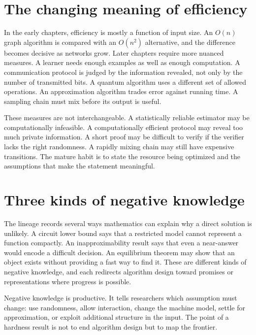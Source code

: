 \section{The changing meaning of efficiency}
In the early chapters, efficiency is mostly a function of input size. An $O(n)$ graph algorithm is compared with an $O(n^2)$ alternative, and the difference becomes decisive as networks grow. Later chapters require more nuanced measures. A learner needs enough examples as well as enough computation. A communication protocol is judged by the information revealed, not only by the number of transmitted bits. A quantum algorithm uses a different set of allowed operations. An approximation algorithm trades error against running time. A sampling chain must mix before its output is useful.

These measures are not interchangeable. A statistically reliable estimator may be computationally infeasible. A computationally efficient protocol may reveal too much private information. A short proof may be difficult to verify if the verifier lacks the right randomness. A rapidly mixing chain may still have expensive transitions. The mature habit is to state the resource being optimized and the assumptions that make the statement meaningful.

\section{Three kinds of negative knowledge}
The lineage records several ways mathematics can explain why a direct solution is unlikely. A circuit lower bound says that a restricted model cannot represent a function compactly. An inapproximability result says that even a near-answer would encode a difficult decision. An equilibrium theorem may show that an object exists without providing a fast way to find it. These are different kinds of negative knowledge, and each redirects algorithm design toward promises or representations where progress is possible.

Negative knowledge is productive. It tells researchers which assumption must change: use randomness, allow interaction, change the machine model, settle for approximation, or exploit additional structure in the input. The point of a hardness result is not to end algorithm design but to map the frontier.

